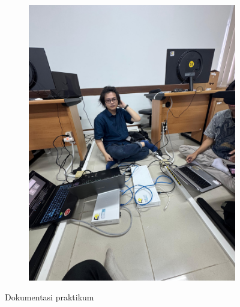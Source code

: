 \begin{figure}[H]
\begin{subfigure}[b]{0.4\linewidth}
		\includegraphics[width=\linewidth]{P4/img/dokum2.jpg}
	\end{subfigure}
	\caption{Dokumentasi praktikum}
	\hspace{1cm}
\end{figure}

